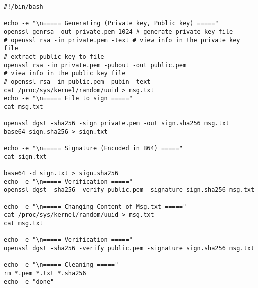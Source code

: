 \documentclass{article}
\begin{document}
\begin{verbatim}
#!/bin/bash

echo -e "\n===== Generating (Private key, Public key) ====="
openssl genrsa -out private.pem 1024 # generate private key file
# openssl rsa -in private.pem -text # view info in the private key file
# extract public key to file
openssl rsa -in private.pem -pubout -out public.pem
# view info in the public key file
# openssl rsa -in public.pem -pubin -text
cat /proc/sys/kernel/random/uuid > msg.txt
echo -e "\n===== File to sign ====="
cat msg.txt

openssl dgst -sha256 -sign private.pem -out sign.sha256 msg.txt
base64 sign.sha256 > sign.txt

echo -e "\n===== Signature (Encoded in B64) ====="
cat sign.txt

base64 -d sign.txt > sign.sha256
echo -e "\n===== Verification ====="
openssl dgst -sha256 -verify public.pem -signature sign.sha256 msg.txt

echo -e "\n===== Changing Content of Msg.txt ====="
cat /proc/sys/kernel/random/uuid > msg.txt
cat msg.txt

echo -e "\n===== Verification ====="
openssl dgst -sha256 -verify public.pem -signature sign.sha256 msg.txt

echo -e "\n===== Cleaning ====="
rm *.pem *.txt *.sha256
echo -e "done"
\end{verbatim}
\end{document}

